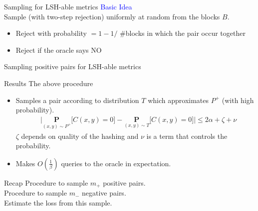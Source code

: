 \documentclass{beamer}
\newcommand{\mb}{\mathbf}
\begin{document}
\begin{frame}{Sampling for LSH-able metrics}
	\textcolor{blue}{Basic Idea}\\
	Sample (with two-step rejection) uniformly at random from the blocks $B$.
	\begin{itemize}
		\vspace{5pt}\item Reject with probability $= 1 - 1/$ \#blocks in which the pair occur together
		\vspace{5pt}\item Reject if the oracle says NO
	\end{itemize} 
\end{frame}

\begin{frame}{Sampling positive pairs for LSH-able metrics}
	\begin{block}{Results}
		The above procedure
		\begin{itemize}
			\item Samples a pair according to distribution $T$ which approximates $P^+$ (with high probability).
			\begin{align*}
  &\Big|\underset{(x, y) \sim P^+}{\mb P} \big[ C(x, y) = 0 ] -\underset{(x, y) \sim T}{\mb P} \big[ C(x, y) = 0 ] \Big| \le 2\alpha + \zeta  + \nu
  			\end{align*} 
			$\zeta$ depends on quality of the hashing and $\nu$ is a term that controls the probability. 
			\item Makes $O(\frac{1}{\beta})$ queries to the oracle in expectation. 
		\end{itemize}			
	\end{block}
\end{frame}

\begin{frame}{Recap}
	Procedure to sample $m_+$ positive pairs.\\

	\vspace{20pt}Procedure to sample $m_-$ negative pairs.\\
	\vspace{20pt}Estimate the loss from this sample.
\end{frame}
\end{document}
